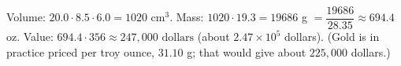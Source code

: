 Volume: $20.0\cdot8.5\cdot6.0=1020$ cm$^3$. Mass: $1020\cdot19.3=19686$ g $=\dfrac{19686}{28.35}\approx694.4$ oz. Value: $694.4\cdot356\approx\boxed{247{,}000\text{ dollars}}$ (about $2.47\times10^5$ dollars). (Gold is in practice priced per troy ounce, $31.10$ g; that would give about $225{,}000$ dollars.)
